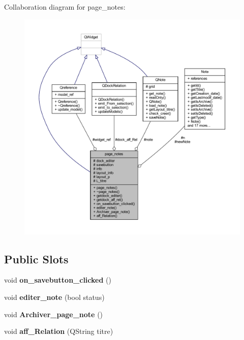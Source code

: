Collaboration diagram for page\+\_\+notes\+:
\nopagebreak
\begin{figure}[H]
\begin{center}
\leavevmode
\includegraphics[width=350pt]{classpage__notes__coll__graph}
\end{center}
\end{figure}
\subsection*{Public Slots}
\begin{DoxyCompactItemize}
\item 
\mbox{\label{classpage__notes_a4d2e70a79da90f0d27331ba989140e05}} 
void {\bfseries on\+\_\+savebutton\+\_\+clicked} ()
\item 
\mbox{\label{classpage__notes_a882eeafe3e68fd54648719624fed2345}} 
void {\bfseries editer\+\_\+note} (bool status)
\item 
\mbox{\label{classpage__notes_a143159873c27f4c3eeee183d031274fb}} 
void {\bfseries Archiver\+\_\+page\+\_\+note} ()
\item 
\mbox{\label{classpage__notes_af0db24bdc1f7bff2398f78a0c32fc51f}} 
void {\bfseries aff\+\_\+\+Relation} (Q\+String titre)
\end{DoxyCompactItemize}

